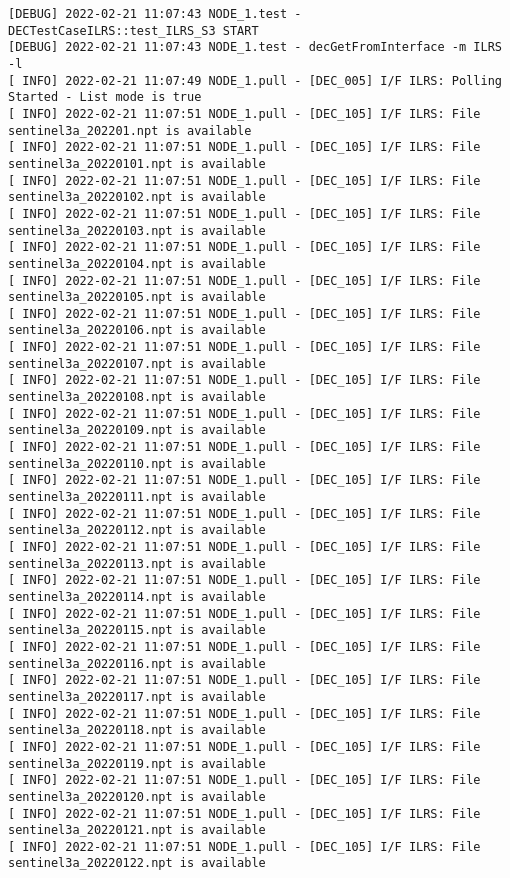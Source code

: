 \documentclass[dec_sum_main.tex]{subfiles}
\begin{document}
	 \newline

	\begin{Verbatim}[fontsize=\tiny]
[DEBUG] 2022-02-21 11:07:43 NODE_1.test - DECTestCaseILRS::test_ILRS_S3 START
[DEBUG] 2022-02-21 11:07:43 NODE_1.test - decGetFromInterface -m ILRS -l
[ INFO] 2022-02-21 11:07:49 NODE_1.pull - [DEC_005] I/F ILRS: Polling Started - List mode is true
[ INFO] 2022-02-21 11:07:51 NODE_1.pull - [DEC_105] I/F ILRS: File sentinel3a_202201.npt is available
[ INFO] 2022-02-21 11:07:51 NODE_1.pull - [DEC_105] I/F ILRS: File sentinel3a_20220101.npt is available
[ INFO] 2022-02-21 11:07:51 NODE_1.pull - [DEC_105] I/F ILRS: File sentinel3a_20220102.npt is available
[ INFO] 2022-02-21 11:07:51 NODE_1.pull - [DEC_105] I/F ILRS: File sentinel3a_20220103.npt is available
[ INFO] 2022-02-21 11:07:51 NODE_1.pull - [DEC_105] I/F ILRS: File sentinel3a_20220104.npt is available
[ INFO] 2022-02-21 11:07:51 NODE_1.pull - [DEC_105] I/F ILRS: File sentinel3a_20220105.npt is available
[ INFO] 2022-02-21 11:07:51 NODE_1.pull - [DEC_105] I/F ILRS: File sentinel3a_20220106.npt is available
[ INFO] 2022-02-21 11:07:51 NODE_1.pull - [DEC_105] I/F ILRS: File sentinel3a_20220107.npt is available
[ INFO] 2022-02-21 11:07:51 NODE_1.pull - [DEC_105] I/F ILRS: File sentinel3a_20220108.npt is available
[ INFO] 2022-02-21 11:07:51 NODE_1.pull - [DEC_105] I/F ILRS: File sentinel3a_20220109.npt is available
[ INFO] 2022-02-21 11:07:51 NODE_1.pull - [DEC_105] I/F ILRS: File sentinel3a_20220110.npt is available
[ INFO] 2022-02-21 11:07:51 NODE_1.pull - [DEC_105] I/F ILRS: File sentinel3a_20220111.npt is available
[ INFO] 2022-02-21 11:07:51 NODE_1.pull - [DEC_105] I/F ILRS: File sentinel3a_20220112.npt is available
[ INFO] 2022-02-21 11:07:51 NODE_1.pull - [DEC_105] I/F ILRS: File sentinel3a_20220113.npt is available
[ INFO] 2022-02-21 11:07:51 NODE_1.pull - [DEC_105] I/F ILRS: File sentinel3a_20220114.npt is available
[ INFO] 2022-02-21 11:07:51 NODE_1.pull - [DEC_105] I/F ILRS: File sentinel3a_20220115.npt is available
[ INFO] 2022-02-21 11:07:51 NODE_1.pull - [DEC_105] I/F ILRS: File sentinel3a_20220116.npt is available
[ INFO] 2022-02-21 11:07:51 NODE_1.pull - [DEC_105] I/F ILRS: File sentinel3a_20220117.npt is available
[ INFO] 2022-02-21 11:07:51 NODE_1.pull - [DEC_105] I/F ILRS: File sentinel3a_20220118.npt is available
[ INFO] 2022-02-21 11:07:51 NODE_1.pull - [DEC_105] I/F ILRS: File sentinel3a_20220119.npt is available
[ INFO] 2022-02-21 11:07:51 NODE_1.pull - [DEC_105] I/F ILRS: File sentinel3a_20220120.npt is available
[ INFO] 2022-02-21 11:07:51 NODE_1.pull - [DEC_105] I/F ILRS: File sentinel3a_20220121.npt is available
[ INFO] 2022-02-21 11:07:51 NODE_1.pull - [DEC_105] I/F ILRS: File sentinel3a_20220122.npt is available


\end{Verbatim}
\end{document}
